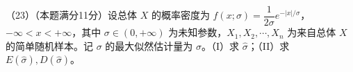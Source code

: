 \documentclass[UTF8,12pt]{ctexart}
\begin{document}
（23）（本题满分11分）设总体 \(\displaystyle X\) 的概率密度为 \(\displaystyle f(x;\sigma)=\dfrac{\displaystyle 1}{\displaystyle 2\sigma}e^{-|x|/\sigma}\)，\(\displaystyle -\infty<x<+\infty\)，其中 \(\displaystyle \sigma\in(0,\allowbreak +\infty)\) 为未知参数，\(\displaystyle X_1,\allowbreak X_2,\allowbreak \cdots,\allowbreak X_n\) 为来自总体 \(\displaystyle X\) 的简单随机样本。记 \(\displaystyle \sigma\) 的最大似然估计量为 \(\displaystyle \hat\sigma\)。（I）求 \(\displaystyle \hat\sigma\)；（II）求 \(\displaystyle E(\hat\sigma),\allowbreak D(\hat\sigma)\)。


\clearpage
\end{document}
